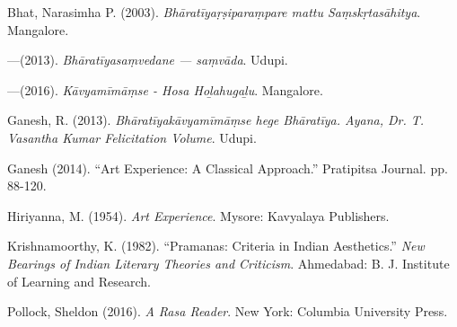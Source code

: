 \newpage

\begin{thebibliography}{99}
\itemsep=2pt
Bhat, Narasimha P. (2003). {\sl Bhāratīyaṛṣiparaṃpare mattu Saṃskṛtasāhitya}. Mangalore. 

---\kern3pt(2013). {\sl Bhāratīyasaṃvedane --- saṃvāda}. Udupi.

---\kern3pt(2016). {\sl Kāvyamīmāṃse - Hosa Hoḻahugaḻu}. Mangalore.

Ganesh, R. (2013). {\sl Bhāratīyakāvyamīmāṃse hege Bhāratīya. Ayana, Dr. T. Vasantha Kumar Felicitation Volume}. Udupi.

Ganesh (2014). ``Art Experience: A Classical Approach.'' Pratipitsa Journal. pp. 88-120.

Hiriyanna, M. (1954). {\sl Art Experience}. Mysore: Kavyalaya Publishers.

Krishnamoorthy, K. (1982). ``Pramanas: Criteria in Indian Aesthetics.'' {\sl New Bearings of Indian Literary Theories and Criticism}. Ahmedabad: B. J. Institute of Learning and Research.

Pollock, Sheldon (2016). {\sl A Rasa Reader}. New York: Columbia University Press.
\end{thebibliography}

\theendnotes
